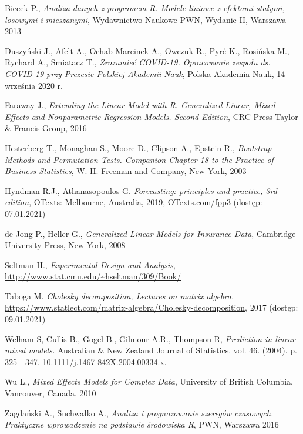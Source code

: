 \documentclass[12pt]{mwbk}
\theoremstyle{plain}
\theoremstyle{definition}
\theoremstyle{definition}
\begin{document}
\begin{thebibliography}{99}



 Biecek P., \emph{Analiza danych z programem R. Modele liniowe z efektami stałymi, losowymi i mieszanymi}, Wydawnictwo Naukowe PWN, Wydanie II, Warszawa 2013

  Duszyński J., Afelt A.,  Ochab-Marcinek A.,
Owczuk R.,  Pyrć K.,  Rosińska M.,
Rychard A.,  Smiatacz T., \emph{Zrozumieć COVID-19. Opracowanie zespołu ds. COVID-19 przy Prezesie Polskiej Akademii Nauk}, Polska Akademia Nauk, 14 września 2020 r.

 Faraway J., \emph{Extending the Linear Model with R. Generalized Linear, Mixed Effects and Nonparametric Regression Models. Second Edition}, CRC Press Taylor \& Francis  Group, 2016

 Hesterberg T.,  Monaghan S., Moore D., Clipson A., Epstein R., \emph{Bootstrap Methods and Permutation Tests. Companion Chapter 18 to the Practice of Business Statistics}, W. H. Freeman and Company, New York, 2003


 Hyndman R.J.,  Athanasopoulos G. \emph{Forecasting: principles and practice, 3rd edition}, OTexts: Melbourne, Australia, 2019, \url{OTexts.com/fpp3} (dostęp: 07.01.2021)

 de Jong P., Heller G., \emph{Generalized Linear Models for Insurance Data}, Cambridge University Press, New York, 2008

 Seltman H., \emph{Experimental Design and Analysis}, \url{http://www.stat.cmu.edu/~hseltman/309/Book/}

 Taboga M. \emph{Cholesky decomposition, Lectures on matrix algebra.} \url{https://www.statlect.com/matrix-algebra/Cholesky-decomposition}, 2017 (dostęp: 09.01.2021)

 Welham S, Cullis B., Gogel B.,  Gilmour A.R.,  Thompson R, \emph{Prediction in linear mixed models.} Australian \& New Zealand Journal of Statistics. vol. 46.  (2004). p.  325 - 347. 10.1111/j.1467-842X.2004.00334.x. 

 Wu L., \emph{Mixed Effects Models for Complex Data}, University of British Columbia, Vancouver, Canada, 2010

 Zagdański A., Suchwałko A., \emph{Analiza i prognozowanie szeregów czasowych. Praktyczne wprowadzenie na podstawie środowiska R}, PWN, Warszawa 2016


\end{thebibliography}
\end{document}
